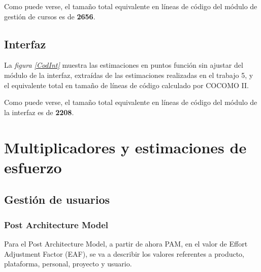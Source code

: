 \documentclass[11pt,a4paper,spanish,twoside]{book}
\begin{document}
Como puede verse, el tamaño total equivalente en líneas de código del módulo
de gestión de cursos es de \textbf{2656}.

\section{Interfaz}
La \emph{figura \ref{CodInt}} muestra las estimaciones en puntos función sin
ajustar del módulo de la interfaz, extraídas de las estimaciones realizadas en
el trabajo 5, y el equivalente total en tamaño de líneas de código calculado
por COCOMO II.


Como puede verse, el tamaño total equivalente en líneas de código del módulo
de la interfaz es de \textbf{2208}.

\chapter{Multiplicadores y estimaciones de esfuerzo}
\section{Gestión de usuarios}
\subsection{Post Architecture Model}
Para el Post Architecture Model, a partir de ahora PAM, en el valor de Effort
Adjustment Factor (EAF), se va a describir los valores referentes a producto,
plataforma, personal, proyecto y usuario. 
\end{document}

